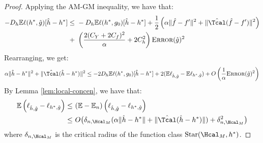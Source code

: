 \documentclass[12pt]{extarticle} %
\newcommand{\E}{\mathbb{E}}
\newcommand{\error}{\ensuremath{\textsc{Error}}}
\begin{document}
\begin{proof}
Applying the AM-GM inequality, we have that:
\begin{align*}
     -D_{h}\E\ell(h^*,\hat{g})[\hat{h}-h^*] \leq~& - D_{h}\E\ell(h^*,g_0)[\hat{h}-h^*]+\frac{1}{2}\left(\alpha\|\hat{f}-f'\|^2 + \|\hat{\Tcal}(\hat{f}-f')\|^2\right)\\
     +~&\left(\frac{2(C_Y+2C_f)^2}{\alpha}+2C_h^2\right)\error(\hat{g})^2
\end{align*}
Rearranging, we get:
\begin{align*}
    \alpha\|\hat{h}-h^*\|^2 + \|\hat{\Tcal}(\hat{h}-h^*)\|^2\leq - 2 D_{h}\E\ell(h^*,g_0)[\hat{h}-h^*]+ 2(\E\ell_{\hat{h},\hat{g}} - \E\ell_{h^*,\hat{g}}) +O\left( \frac{1}{\alpha} \error(\hat{g})^2\right) \label{eqn:norm_f}
\end{align*}
By Lemma \ref{lem:local-concen}, we have that:
\begin{align*}
    \E\left(\ell_{\hat{h},\hat{g}} - \ell_{h^*,\hat{g}}\right) \leq~& (\E - \E_n)\left(\ell_{\hat{h},\hat{g}} - \ell_{h^*,\hat{g}}\right)\\
    \leq~& O\big(\delta_{n,\Hcal_M}(\alpha \|\hat{h}-h^*\| + \|\hat{\Tcal}(\hat{h}-h^*)\|) + \delta_{n,\Hcal_M}^2\big)
\end{align*} where $\delta_{n,\Hcal_M}$ is the critical radius of the function class $\text{Star}(\Hcal_M,h^*)$.


\end{proof}
\end{document}
